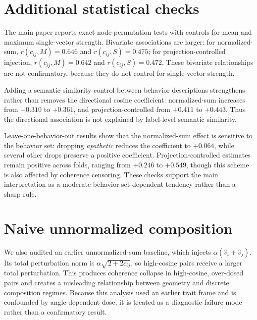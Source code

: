 \documentclass{article}
\begin{document}
\section{Additional statistical checks}
\label{app:stats}

The main paper reports exact node-permutation tests with controls for mean and maximum
single-vector strength. Bivariate associations are larger: for normalized-sum,
$r(c_{ij},M)=0.646$ and $r(c_{ij},S)=0.475$; for projection-controlled injection,
$r(c_{ij},M)=0.642$ and $r(c_{ij},S)=0.472$. These bivariate relationships are not confirmatory,
because they do not control for single-vector strength.

Adding a semantic-similarity control between behavior descriptions strengthens rather than removes
the directional cosine coefficient: normalized-sum increases from $+0.310$ to $+0.361$, and
projection-controlled from $+0.411$ to $+0.443$. Thus the directional association is not explained
by label-level semantic similarity.

Leave-one-behavior-out results show that the normalized-sum effect is sensitive to the behavior set:
dropping \emph{apathetic} reduces the coefficient to $+0.064$, while several other drops preserve a
positive coefficient. Projection-controlled estimates remain positive across folds, ranging from
$+0.246$ to $+0.549$, though this scheme is also affected by coherence censoring. These checks
support the main interpretation as a moderate behavior-set-dependent tendency rather than a sharp
rule.

\section{Naive unnormalized composition}
\label{app:naive}

We also audited an earlier unnormalized-sum baseline, which injects $\alpha(\hat v_i+\hat v_j)$.
Its total perturbation norm is $\alpha\sqrt{2+2c_{ij}}$, so high-cosine pairs receive a larger total
perturbation. This produces coherence collapse in high-cosine, over-dosed pairs and creates a
misleading relationship between geometry and discrete composition regimes. Because this analysis
used an earlier trait frame and is confounded by angle-dependent dose, it is treated as a diagnostic
failure mode rather than a confirmatory result.
\end{document}
